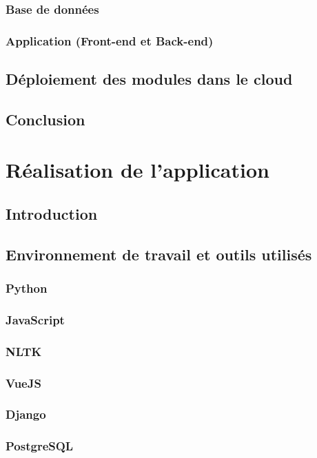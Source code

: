\documentclass[]{report}
\begin{document}
		\subsection{Base de données}
		\subsection{Application (Front-end et Back-end)}		
	\section{Déploiement des modules dans le cloud}
		
	\section{Conclusion}


\chapter{Réalisation de l'application}
\section{Introduction}

\section{Environnement de travail et outils utilisés}
\subsection{Python}
\subsection{JavaScript}
\subsection{NLTK}
\subsection{VueJS}
\subsection{Django}
\subsection{PostgreSQL}
\end{document}
